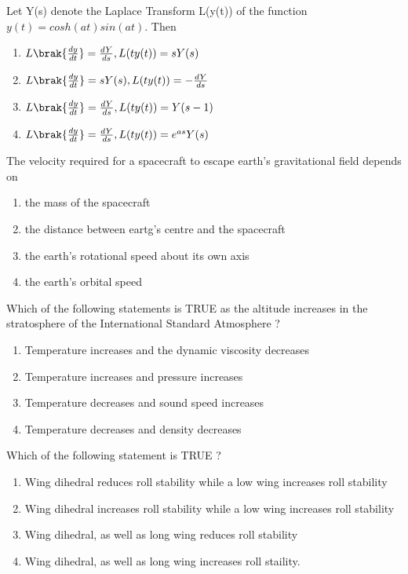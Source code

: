 	\item Let Y(s) denote the Laplace Transform L(y(t)) of the function $ y(t) = cosh(at)sin(at) $. Then
		\begin{enumerate}
			\item $L\brak{\frac{dy}{dt}} = \frac{dY}{ds}, L(ty(t)) = sY(s) $
			\item $L\brak{\frac{dy}{dt}} = sY(s) , L(ty(t)) = -\frac{dY}{ds} $
			\item $L\brak{\frac{dy}{dt}} = \frac{dY}{ds}, L(ty(t)) = Y(s-1) $
			\item $L\brak{\frac{dy}{dt}} = \frac{dY}{ds}, L(ty(t)) = e^{as}Y(s) $
		\end{enumerate}
	\item The velocity required for a spacecraft to escape earth's gravitational field depends on
		\begin{enumerate}
			\item the mass of the spacecraft
			\item the distance between eartg's centre and the spacecraft
			\item the earth's rotational speed about its own axis
			\item the earth's orbital speed
		\end{enumerate}
	\item Which of the following statements is TRUE as the altitude increases in the stratosphere of the International Standard Atmosphere ?
		\begin{enumerate}
			\item Temperature increases and the dynamic viscosity decreases
			\item Temperature increases and pressure increases
			\item Temperature decreases and sound speed increases
			\item Temperature decreases and density decreases
		\end{enumerate}
	\item Which of the following statement is TRUE ?
		\begin{enumerate}
			\item Wing dihedral reduces roll stability while a low wing increases roll stability
			\item Wing dihedral increases roll stability while a low wing increases roll stability
			\item Wing dihedral, as well as long wing reduces roll stability
			\item Wing dihedral, as well as long wing increases roll staility.
		\end{enumerate}
